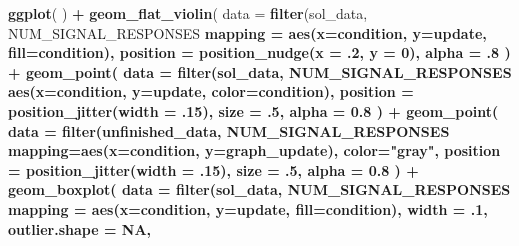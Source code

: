 \documentclass[]{book}
\newenvironment{Shaded}{\begin{snugshade}}{\end{snugshade}}
\newcommand{\DataTypeTok}[1]{\textcolor[rgb]{0.13,0.29,0.53}{#1}}
\newcommand{\DecValTok}[1]{\textcolor[rgb]{0.00,0.00,0.81}{#1}}
\newcommand{\FloatTok}[1]{\textcolor[rgb]{0.00,0.00,0.81}{#1}}
\newcommand{\KeywordTok}[1]{\textcolor[rgb]{0.13,0.29,0.53}{\textbf{#1}}}
\newcommand{\NormalTok}[1]{#1}
\newcommand{\OperatorTok}[1]{\textcolor[rgb]{0.81,0.36,0.00}{\textbf{#1}}}
\newcommand{\OtherTok}[1]{\textcolor[rgb]{0.56,0.35,0.01}{#1}}
\newcommand{\StringTok}[1]{\textcolor[rgb]{0.31,0.60,0.02}{#1}}
\begin{document}
\begin{Shaded}
\begin{Highlighting}[]
\KeywordTok{ggplot}\NormalTok{( ) }\OperatorTok{+}
\StringTok{  }\KeywordTok{geom_flat_violin}\NormalTok{(}
    \DataTypeTok{data =} \KeywordTok{filter}\NormalTok{(sol_data, NUM_SIGNAL_RESPONSES }\OperatorTok{%
    \DataTypeTok{mapping =} \KeywordTok{aes}\NormalTok{(}\DataTypeTok{x=}\NormalTok{condition, }\DataTypeTok{y=}\NormalTok{update, }\DataTypeTok{fill=}\NormalTok{condition),}
    \DataTypeTok{position =} \KeywordTok{position_nudge}\NormalTok{(}\DataTypeTok{x =} \FloatTok{.2}\NormalTok{, }\DataTypeTok{y =} \DecValTok{0}\NormalTok{),}
    \DataTypeTok{alpha =} \FloatTok{.8}
\NormalTok{  ) }\OperatorTok{+}
\StringTok{  }\KeywordTok{geom_point}\NormalTok{(}
    \DataTypeTok{data =} \KeywordTok{filter}\NormalTok{(sol_data, NUM_SIGNAL_RESPONSES }\OperatorTok{%
    \KeywordTok{aes}\NormalTok{(}\DataTypeTok{x=}\NormalTok{condition, }\DataTypeTok{y=}\NormalTok{update, }\DataTypeTok{color=}\NormalTok{condition),}
    \DataTypeTok{position =} \KeywordTok{position_jitter}\NormalTok{(}\DataTypeTok{width =} \FloatTok{.15}\NormalTok{),}
    \DataTypeTok{size =} \FloatTok{.5}\NormalTok{,}
    \DataTypeTok{alpha =} \FloatTok{0.8}
\NormalTok{  ) }\OperatorTok{+}
\StringTok{  }\KeywordTok{geom_point}\NormalTok{(}
    \DataTypeTok{data =} \KeywordTok{filter}\NormalTok{(unfinished_data, NUM_SIGNAL_RESPONSES }\OperatorTok{%
    \DataTypeTok{mapping=}\KeywordTok{aes}\NormalTok{(}\DataTypeTok{x=}\NormalTok{condition, }\DataTypeTok{y=}\NormalTok{graph_update),}
    \DataTypeTok{color=}\StringTok{"gray"}\NormalTok{,}
    \DataTypeTok{position =} \KeywordTok{position_jitter}\NormalTok{(}\DataTypeTok{width =} \FloatTok{.15}\NormalTok{),}
    \DataTypeTok{size =} \FloatTok{.5}\NormalTok{,}
    \DataTypeTok{alpha =} \FloatTok{0.8}
\NormalTok{  ) }\OperatorTok{+}
\StringTok{  }\KeywordTok{geom_boxplot}\NormalTok{(}
    \DataTypeTok{data =} \KeywordTok{filter}\NormalTok{(sol_data, NUM_SIGNAL_RESPONSES }\OperatorTok{%
    \DataTypeTok{mapping =} \KeywordTok{aes}\NormalTok{(}\DataTypeTok{x=}\NormalTok{condition, }\DataTypeTok{y=}\NormalTok{update, }\DataTypeTok{fill=}\NormalTok{condition),}
    \DataTypeTok{width =} \FloatTok{.1}\NormalTok{,}
    \DataTypeTok{outlier.shape =} \OtherTok{NA}\NormalTok{,}
}}}}
\end{Highlighting}
\end{Shaded}
\end{document}
